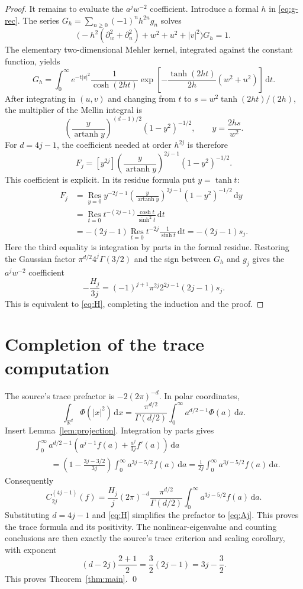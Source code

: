 \documentclass[11pt]{article}
\newcommand{\R}{\mathbb R}
\newcommand{\dd}{\,\mathrm d}
\newcommand{\Res}{\operatorname*{Res}}
\begin{document}
\begin{proof}
It remains to evaluate the $a^jw^{-2}$ coefficient.  Introduce a formal $h$
in \eqref{eq:g-rec}.  The series
$G_h=\sum_{n\geq0}(-1)^nh^{2n}g_n$ solves
\[
 \bigl(-h^2(\partial_w^2+\partial_u^2)+w^2+u^2+|v|^2\bigr)G_h=1.
\]
The elementary two-dimensional Mehler kernel, integrated against the
constant function, yields
\[
 G_h=\int_0^\infty e^{-t|v|^2}\frac1{\cosh(2ht)}
 \exp\left[-\frac{\tanh(2ht)}{2h}(w^2+u^2)\right]\dd t.
\]
After integrating in $(u,v)$ and changing from $t$ to
$s=w^2\tanh(2ht)/(2h)$, the multiplier of the Mellin integral is
\[
 \left(\frac{y}{\operatorname{artanh}y}\right)^{(d-1)/2}
 (1-y^2)^{-1/2},\qquad y=\frac{2hs}{w^2}.
\]
For $d=4j-1$, the coefficient needed at order $h^{2j}$ is therefore
\[
 F_j=[y^{2j}]
 \left(\frac{y}{\operatorname{artanh}y}\right)^{2j-1}
 (1-y^2)^{-1/2}.
\]
This coefficient is explicit.  In its residue formula put $y=\tanh t$:
\begin{align*}
 F_j
 &=\Res_{y=0}y^{-2j-1}
   \left(\frac{y}{\operatorname{artanh}y}\right)^{2j-1}
   (1-y^2)^{-1/2}\dd y\\
 &=\Res_{t=0}t^{-(2j-1)}\frac{\cosh t}{\sinh^2t}\dd t\\
 &=-(2j-1)\Res_{t=0}t^{-2j}\frac1{\sinh t}\dd t
 =-(2j-1)s_j.
\end{align*}
Here the third equality is integration by parts in the formal residue.
Restoring the Gaussian factor
$\pi^{d/2}4^j\Gamma(3/2)$ and the sign between $G_h$ and $g_j$ gives the
$a^jw^{-2}$ coefficient
\[
 -\frac{H_j}{3j}
 =(-1)^{j+1}\pi^{2j}2^{2j-1}(2j-1)s_j.
\]
This is equivalent to \eqref{eq:H}, completing the induction and the proof.
\end{proof}

\section{Completion of the trace computation}

The source's trace prefactor is $-2(2\pi)^{-d}$.  In polar coordinates,
\[
 \int_{\R^d}\Phi(|x|^2)\dd x
 =\frac{\pi^{d/2}}{\Gamma(d/2)}\int_0^\infty
 a^{d/2-1}\Phi(a)\dd a.
\]
Insert Lemma~\ref{lem:projection}.  Integration by parts gives
\begin{align*}
 &\int_0^\infty a^{d/2-1}
 \left(a^{j-1}f(a)+\frac{a^j}{3j}f'(a)\right)\dd a\\
 &\qquad=\left(1-\frac{3j-3/2}{3j}\right)
 \int_0^\infty a^{3j-5/2}f(a)\dd a
 =\frac1{2j}\int_0^\infty a^{3j-5/2}f(a)\dd a.
\end{align*}
Consequently
\[
 C_{2j}^{(4j-1)}(f)
 =\frac{H_j}{j}(2\pi)^{-d}
   \frac{\pi^{d/2}}{\Gamma(d/2)}
   \int_0^\infty a^{3j-5/2}f(a)\dd a.
\]
Substituting $d=4j-1$ and \eqref{eq:H} simplifies the prefactor to
\eqref{eq:Aj}.  This proves the trace formula and its positivity.  The
nonlinear-eigenvalue and counting conclusions are then exactly the source's
trace criterion and scaling corollary, with exponent
\[
 (d-2j)\frac{2+1}{2}=\frac32(2j-1)=3j-\frac32.
\]
This proves Theorem~\ref{thm:main}. \qed
\end{document}

